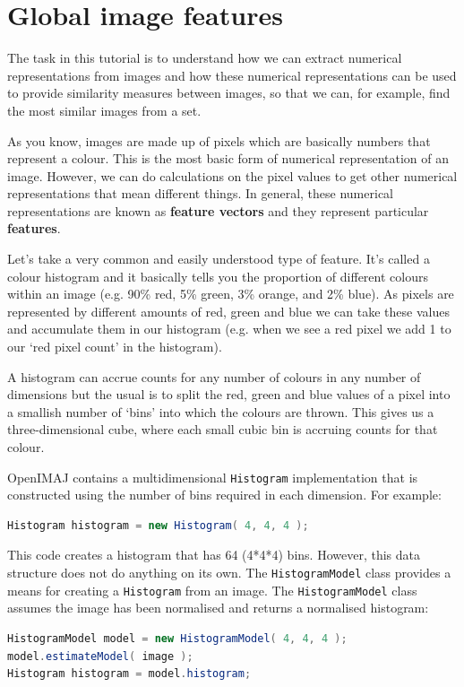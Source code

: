 \documentclass[10pt,a4paper,twoside,extrafontsizes]{memoir}
\begin{document}
\chapter{Global image features}
The task in this tutorial is to understand how we can extract numerical representations from images 
and how these numerical representations can be used to provide similarity measures between images, 
so that we can, for example, find the most similar images from a set.

As you know, images are made up of pixels which are basically numbers that represent a colour. 
This is the most basic form of numerical representation of an image. However, we can do calculations 
on the pixel values to get other numerical representations that mean different things. In general, 
these numerical representations are known as \textbf{feature vectors} and they represent particular 
\textbf{features}.

Let's take a very common and easily understood type of feature. It's called a colour histogram and 
it basically tells you the proportion of different colours within an image (e.g. 90\% red, 5\% green, 
3\% orange, and 2\% blue). As pixels are represented by different amounts of red, green and blue we 
can take these values and accumulate them in our histogram (e.g. when we see a red pixel we add 1 
to our `red pixel count' in the histogram). 

A histogram can accrue counts for any number of colours in any number of dimensions but the usual 
is to split the red, green and blue values of a pixel into a smallish number of `bins' into which the 
colours are thrown.  This gives us a three-dimensional cube, where each small cubic bin is accruing 
counts for that colour.

OpenIMAJ contains a multidimensional \verb+Histogram+ implementation that is constructed using the number 
of bins required in each dimension. For example:
\begin{lstlisting}[language=java]
Histogram histogram = new Histogram( 4, 4, 4 );
\end{lstlisting}
This code creates a histogram that has 64 (4*4*4) bins. However, this data structure does not do 
anything on its own. The \verb+HistogramModel+ class provides a means for creating a \verb+Histogram+ 
from an image.  The \verb+HistogramModel+ class assumes the image has been normalised and returns a normalised histogram:
\begin{lstlisting}[language=java]
HistogramModel model = new HistogramModel( 4, 4, 4 );
model.estimateModel( image );
Histogram histogram = model.histogram;
\end{lstlisting}
\end{document}
